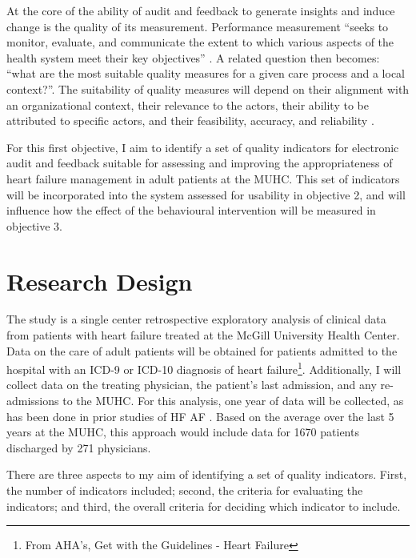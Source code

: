 

At the core of the ability of audit and feedback to generate insights and induce change is the quality of its measurement. Performance measurement ``seeks to monitor, evaluate, and communicate the extent to which various aspects of the health system meet their key objectives'' \cite{smith2009performance}. A related question then becomes: ``what are the most suitable quality measures for a given care process and a local context?''. The suitability of quality measures will depend on their alignment with an organizational context, their relevance to the actors, their ability to be attributed to specific actors, and their feasibility, accuracy, and reliability \cite{polanczyk2019quality}.

For this first objective, I aim to identify a set of quality indicators for electronic audit and feedback suitable for assessing and improving the appropriateness of heart failure management in adult patients at the MUHC. This set of indicators will be incorporated into the system assessed for usability in objective 2, and will influence how the effect of the behavioural intervention will be measured in objective 3.

\section{Research Design}
The study is a single center retrospective exploratory analysis of clinical data from patients with heart failure treated at the McGill University Health Center. Data on the care of adult patients will be obtained for patients admitted to the hospital with an ICD-9 or ICD-10 diagnosis of heart failure\footnote{From AHA's, Get with the Guidelines\textsuperscript{\textcopyright} - Heart Failure}. Additionally, I will collect data on the treating physician, the patient's last admission, and any re-admissions to the \gls{MUHC}. For this analysis, one year of data will be collected, as has been done in prior studies of \gls{HF} \gls{AF} \cite{kasje2006educational}. Based on the average over the last 5 years at the MUHC, this approach would include data for 1670 patients discharged by 271 physicians.

There are three aspects to my aim of identifying a set of quality indicators. First, the number of indicators included; second, the criteria for evaluating the indicators; and third, the overall criteria for deciding which indicator to include.

